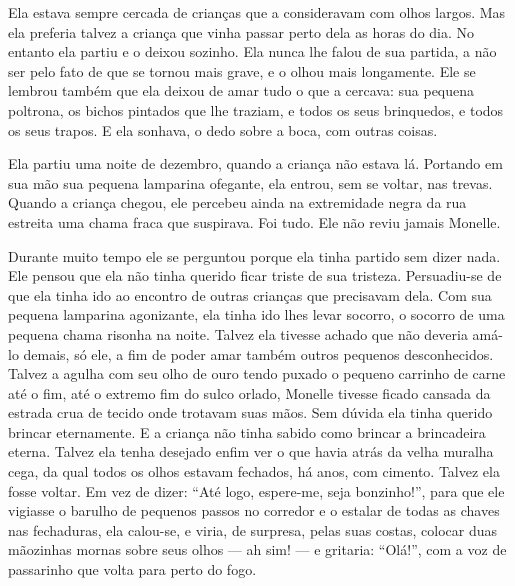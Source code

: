 Ela estava sempre cercada de crianças que a consideravam com olhos
largos. Mas ela preferia talvez a criança que vinha passar perto dela as
horas do dia. No entanto ela partiu e o deixou sozinho. Ela nunca lhe
falou de sua partida, a não ser pelo fato de que se tornou mais grave, e o
olhou mais longamente. Ele se lembrou também que ela deixou de amar tudo o
que a cercava: sua pequena poltrona, os bichos pintados que lhe traziam, e
todos os seus brinquedos, e todos os seus trapos. E ela sonhava, o dedo
sobre a boca, com outras coisas.

Ela partiu uma noite de dezembro, quando a criança não estava lá.
Portando em sua mão sua pequena lamparina ofegante, ela entrou, sem se
voltar, nas trevas. Quando a criança chegou, ele percebeu ainda na
extremidade negra da rua estreita uma chama fraca que suspirava. Foi tudo.
Ele não reviu jamais Monelle.

Durante muito tempo ele se perguntou porque ela tinha partido sem
dizer nada. Ele pensou que ela não tinha querido ficar triste de sua
tristeza. Persuadiu-se de que ela tinha ido ao encontro de outras crianças
que precisavam dela. Com sua pequena lamparina agonizante, ela tinha ido
lhes levar socorro, o socorro de uma pequena chama risonha na noite.
Talvez ela tivesse achado que não deveria amá-lo demais, só ele, a fim de
poder amar também outros pequenos desconhecidos. Talvez a agulha com seu
olho de ouro tendo puxado o pequeno carrinho de carne até o fim, até o
extremo fim do sulco orlado, Monelle tivesse ficado cansada da estrada
crua de tecido onde trotavam suas mãos. Sem dúvida ela tinha querido
brincar eternamente. E a criança não tinha sabido como brincar a
brincadeira eterna. Talvez ela tenha desejado enfim ver o que havia atrás
da velha muralha cega, da qual todos os olhos estavam fechados, há anos,
com cimento. Talvez ela fosse voltar. Em vez de dizer: “Até logo,
espere-me, seja bonzinho!”, para que ele vigiasse o barulho de pequenos
passos no corredor e o estalar de todas as chaves nas fechaduras, ela
calou-se, e viria, de surpresa, pelas suas costas, colocar duas mãozinhas
mornas sobre seus olhos --- ah sim! --- e gritaria: “Olá!”, com a voz de
passarinho que volta para perto do fogo.

